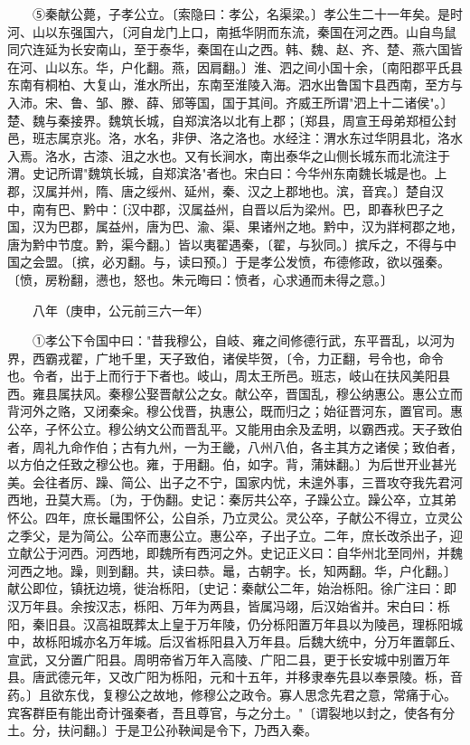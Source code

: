 　　⑤秦献公薨，子孝公立。〔索隐曰：孝公，名渠梁。〕孝公生二十一年矣。是时河、山以东强国六，〔河自龙门上口，南抵华阴而东流，秦国在河之西。山自鸟鼠同穴连延为长安南山，至于泰华，秦国在山之西。韩、魏、赵、齐、楚、燕六国皆在河、山以东。华，户化翻。燕，因肩翻。〕淮、泗之间小国十余，〔南阳郡平氏县东南有桐柏、大复山，淮水所出，东南至淮陵入海。泗水出鲁国卞县西南，至方与入沛。宋、鲁、邹、滕、薛、郳等国，国于其间。齐威王所谓"泗上十二诸侯"。〕楚、魏与秦接界。魏筑长城，自郑滨洛以北有上郡；〔郑县，周宣王母弟郑桓公封邑，班志属京兆。洛，水名，非伊、洛之洛也。水经注：渭水东过华阴县北，洛水入焉。洛水，古漆、沮之水也。又有长涧水，南出泰华之山侧长城东而北流注于渭。史记所谓"魏筑长城，自郑滨洛"者也。宋白曰：今华州东南魏长城是也。上郡，汉属并州，隋、唐之绥州、延州，秦、汉之上郡地也。滨，音宾。〕楚自汉中，南有巴、黔中：〔汉中郡，汉属益州，自晋以后为梁州。巴，即春秋巴子之国，汉为巴郡，属益州，唐为巴、渝、渠、果诸州之地。黔中，汉为牂柯郡之地，唐为黔中节度。黔，渠今翻。〕皆以夷翟遇秦，〔翟，与狄同。〕摈斥之，不得与中国之会盟。〔摈，必刃翻。与，读曰预。〕于是孝公发愤，布德修政，欲以强秦。〔愤，房粉翻，懑也，怒也。朱元晦曰：愤者，心求通而未得之意。〕

　　八年（庚申，公元前三六一年）

　　①孝公下令国中曰："昔我穆公，自岐、雍之间修德行武，东平晋乱，以河为界，西霸戎翟，广地千里，天子致伯，诸侯毕贺，〔令，力正翻，号令也，命令也。令者，出于上而行于下者也。岐山，周太王所邑。班志，岐山在扶风美阳县西。雍县属扶风。秦穆公娶晋献公之女。献公卒，晋国乱，穆公纳惠公。惠公立而背河外之赂，又闭秦籴。穆公伐晋，执惠公，既而归之；始征晋河东，置官司。惠公卒，子怀公立。穆公纳文公而晋乱平。又能用由余及孟明，以霸西戎。天子致伯者，周礼九命作伯；古有九州，一为王畿，八州八伯，各主其方之诸侯；致伯者，以方伯之任致之穆公也。雍，于用翻。伯，如字。背，蒲妹翻。〕为后世开业甚光美。会往者厉、躁、简公、出子之不宁，国家内忧，未遑外事，三晋攻夺我先君河西地，丑莫大焉。〔为，于伪翻。史记：秦厉共公卒，子躁公立。躁公卒，立其弟怀公。四年，庶长鼂围怀公，公自杀，乃立灵公。灵公卒，子献公不得立，立灵公之季父，是为简公。公卒而惠公立。惠公卒，子出子立。二年，庶长改杀出子，迎立献公于河西。河西地，即魏所有西河之外。史记正义曰：自华州北至同州，并魏河西之地。躁，则到翻。共，读曰恭。鼂，古朝字。长，知两翻。华，户化翻。〕献公即位，镇抚边境，徙治栎阳，〔史记：秦献公二年，始治栎阳。徐广注曰：即汉万年县。余按汉志，栎阳、万年为两县，皆属冯翊，后汉始省并。宋白曰：栎阳，秦旧县。汉高祖既葬太上皇于万年陵，仍分栎阳置万年县以为陵邑，理栎阳城中，故栎阳城亦名万年城。后汉省栎阳县入万年县。后魏大统中，分万年置鄣丘、宣武，又分置广阳县。周明帝省万年入高陵、广阳二县，更于长安城中别置万年县。唐武德元年，又改广阳为栎阳，元和十五年，并移隶奉先县以奉景陵。栎，音药。〕且欲东伐，复穆公之故地，修穆公之政令。寡人思念先君之意，常痛于心。宾客群臣有能出奇计强秦者，吾且尊官，与之分土。"〔谓裂地以封之，使各有分土。分，扶问翻。〕于是卫公孙鞅闻是令下，乃西入秦。

